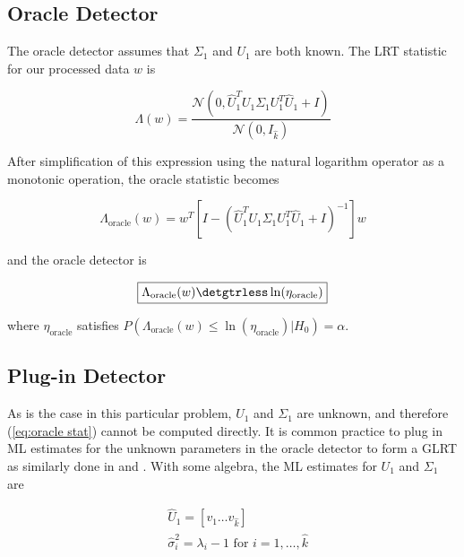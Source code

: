 \subsection{Oracle Detector}\label{sec:oracle}

The oracle detector assumes that $\Sigma_1$ and $U_1$ are both known. The LRT statistic for our processed data $w$ is

\begin{equation*}
\Lambda(w)=\frac{\mathcal{N}(0,\widehat{U}_1^TU_1\Sigma_1U_1^T\widehat{U}_1 +I)}{\mathcal{N}(0,I_{\widehat{k}})}
\end{equation*}

After simplification of this expression using the natural logarithm operator as a monotonic operation, the oracle statistic becomes

\begin{equation}\label{eq:oracle stat}
\boxed{\Lambda_{\text{oracle}}(w) = w^T\left[I-\left(\widehat{U}_1^TU_1\Sigma_1U_1^T\widehat{U}_1+I\right)^{-1}\right]w}
\end{equation}

and the oracle detector is

\begin{equation}\label{eq:oracle classifier}
\boxed{\Lambda_{\text{oracle}}(w) \detgtrless \ln(\eta_{\text{oracle}})}
\end{equation}

where $\eta_{\text{oracle}}$ satisfies $P(\Lambda_{\text{oracle}}(w)\leq\ln\left(\eta_{\text{oracle}}\right)|H_0)=\alpha$.

\subsection{Plug-in Detector}\label{sec:plugin}

As is the case in this particular problem, $U_1$ and $\Sigma_1$ are unknown, and therefore (\ref{eq:oracle stat}) cannot be computed directly. It is common practice to plug in ML estimates for the unknown parameters in the oracle detector to form a GLRT as similarly done in \cite{jin2005cfar} and \cite{mcwhorter2003matched}. With some algebra, the ML estimates for $U_1$ and $\Sigma_1$ are

\begin{equation}\label{eq:param estims}
\begin{aligned}
&\widehat{U}_1=[v_1 \dots v_{\widehat{k}}]\\
&\widehat{\sigma}_i^2 = \lambda_i -1 \text{ for } i=1,\dots,\widehat{k}\\
\end{aligned}
\end{equation}

